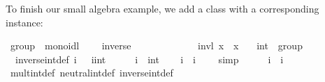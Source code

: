 \begin{isabellebody}
%
\endisadelimquote
%
\begin{isamarkuptext}%
\noindent To finish our small algebra example, we add a  class with a corresponding instance:%
\end{isamarkuptext}%
\isamarkuptrue%
%
\isadelimquote
%
\endisadelimquote
%
\isatagquote
{}\isamarkupfalse%
\ group\ {\isacharequal}\ monoidl\ {\isacharplus}\isanewline
\ \ \ inverse\ {\isacharcolon}{\isacharcolon}\ {\isachardoublequoteopen}{\isasymalpha}\ {\isasymRightarrow}\ {\isasymalpha}{\isachardoublequoteclose}\ \ \ \ {\isacharparenleft}{\isachardoublequoteopen}{\isacharparenleft}{\isacharunderscore}{\isasymdiv}{\isacharparenright}{\isachardoublequoteclose}\ {\isacharbrackleft}{}{}{}{}{\isacharbrackright}\ {}{}{}{\isacharparenright}\isanewline
\ \ \ invl{\isacharcolon}\ {\isachardoublequoteopen}x{\isasymdiv}\ {\isasymotimes}\ x\ {\isacharequal}\ {\isasymone}{\isachardoublequoteclose}\isanewline
\isanewline
{}\isamarkupfalse%
\ int\ {\isacharcolon}{\isacharcolon}\ group\isanewline
{}\isanewline
\isanewline
{}\isamarkupfalse%
\isanewline
\ \ inverse{\isacharunderscore}int{\isacharunderscore}def{\isacharcolon}\ {\isachardoublequoteopen}i{\isasymdiv}\ {\isacharequal}\ {\isacharminus}\ {\isacharparenleft}i{\isasymColon}int{\isacharparenright}{\isachardoublequoteclose}\isanewline
\isanewline
{}\isamarkupfalse%
\ \isamarkupfalse%
\isanewline
\ \ \isamarkupfalse%
\ i\ {\isacharcolon}{\isacharcolon}\ int\isanewline
\ \ \isamarkupfalse%
\ {\isachardoublequoteopen}{\isacharminus}i\ {\isacharplus}\ i\ {\isacharequal}\ {}{\isachardoublequoteclose}\ \isamarkupfalse%
\ simp\isanewline
\ \ \isamarkupfalse%
\ \isamarkupfalse%
\ {\isachardoublequoteopen}i{\isasymdiv}\ {\isasymotimes}\ i\ {\isacharequal}\ {\isasymone}{\isachardoublequoteclose}\isanewline
\ \ \ \ \isamarkupfalse%
\ mult{\isacharunderscore}int{\isacharunderscore}def\ neutral{\isacharunderscore}int{\isacharunderscore}def\ inverse{\isacharunderscore}int{\isacharunderscore}def\ \isacommand{{\isachardot}}\isamarkupfalse%
\isanewline
{}\isamarkupfalse%
\isanewline
\isanewline
{}\isamarkupfalse%
%
\endisatagquote
{\isafoldquote}%
%
\isadelimquote
%
\endisadelimquote
%
\end{isabellebody}

